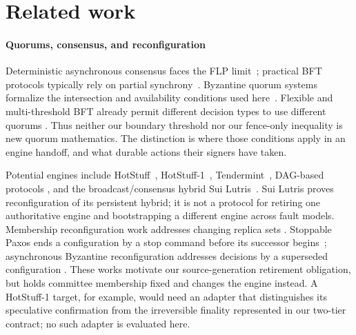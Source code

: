 \section{Related work}
\label{sec:related}

\paragraph{Quorums, consensus, and reconfiguration}
Deterministic asynchronous consensus faces the FLP limit~\cite{flp}; practical BFT protocols
typically rely on partial synchrony~\cite{dls,pbft}. Byzantine quorum systems formalize the
intersection and availability conditions used here~\cite{byzantinequorums}. Flexible and
multi-threshold BFT already permit different decision types to use different quorums
\cite{flexiblebft,multithresholdbft}. Thus neither our boundary threshold nor our fence-only
inequality is new quorum mathematics. The distinction is where those conditions apply in an
engine handoff, and what durable actions their signers have taken.

Potential engines include HotStuff~\cite{hotstuff}, HotStuff-1~\cite{hotstuff1},
Tendermint~\cite{tendermint}, DAG-based protocols
\cite{narwhal,bullshark,shoal,shoalpp,autobahn,mysticeti}, and the broadcast/consensus hybrid
Sui Lutris~\cite{suilutris}. Sui Lutris proves reconfiguration of its persistent hybrid; it is
not a protocol for retiring one authoritative engine and bootstrapping a different engine across
fault models. Membership reconfiguration work addresses changing replica sets
\cite{verticalpaxos,reconfig,bftsmart,mongoraft,dynanet,hydra}. Stoppable Paxos ends a
configuration by a stop command before its successor begins~\cite{stoppablepaxos}; asynchronous
Byzantine reconfiguration addresses decisions by a superseded configuration
\cite{asyncreconfig}. These works motivate our source-generation retirement obligation, but
\sage{} holds committee membership fixed and changes the engine instead. A HotStuff-1 target,
for example, would need an adapter that distinguishes its speculative confirmation from the
irreversible finality represented in our two-tier contract; no such adapter is evaluated here.

